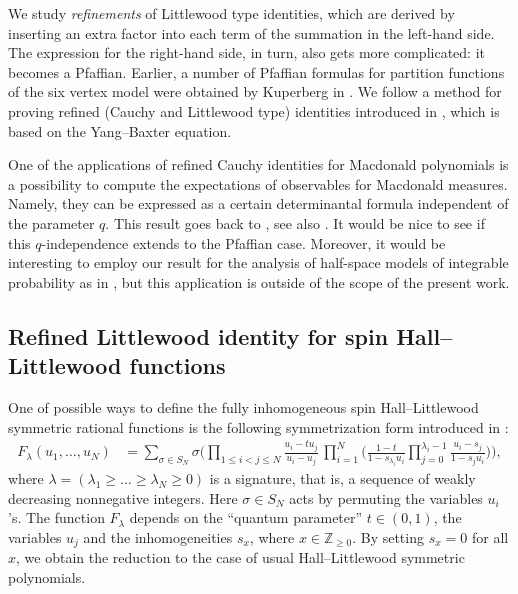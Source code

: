 \documentclass[11pt]{article}
\theoremstyle{definition}
\begin{document}
We study \emph{refinements} of Littlewood type identities,
which are derived by inserting an extra factor
into each term of the summation in the left-hand side.
The expression for the right-hand side, in turn, also gets more complicated: it becomes a Pfaffian. Earlier, a number of Pfaffian formulas for partition functions of the six vertex model were obtained by Kuperberg in \cite{Kup02}. We follow a method for proving refined (Cauchy and Littlewood type) identities introduced in \cite{WZJ16}, which is based on the Yang--Baxter equation.

One of the applications of refined Cauchy identities for Macdonald polynomials is a possibility to compute the expectations of observables for Macdonald
measures. Namely, they can be expressed as a certain determinantal formula independent of the parameter $q$.
This result goes back to 
\cite{KN99}, see also \cite{War08,Bor18,Pet21}.
It would be nice to see if this $q$-independence extends to the Pfaffian case. Moreover, it would be interesting to employ our result for the analysis of half-space models of integrable probability as in \cite{BBC20,BBCW18,BZ19}, but this application is outside of the scope of the present work.

\subsection{Refined Littlewood identity for spin Hall--Littlewood functions}

One of possible ways to define the fully inhomogeneous 
spin Hall--Littlewood 
symmetric rational functions is the following
symmetrization form introduced in \cite{BP18}:
\begin{equation*}
\begin{split}
F_\lambda(u_1,\ldots,u_N )
&=
\sum_{\sigma\in S_N}
\sigma
\Biggl( 
\prod_{1\le i<j\le N}\frac{u_i-t u_j}{u_i-u_j}\,
\prod_{i=1}^{N}
\biggl(
\frac{1-t}{1-s_{\lambda_i}u_i}
\prod_{j=0}^{\lambda_i-1}\frac{ u_i-s_j}{1- s_j u_i}
\biggr)
\Biggr),
\end{split}
\end{equation*}
where 
$\lambda=(\lambda_1\ge\ldots\ge \lambda_N\ge0 )$ is a signature, that is, a sequence of weakly decreasing nonnegative integers.
Here $\sigma\in S_N$
acts by permuting the variables $u_i$'s.
The function $F_\lambda$ depends on the ``quantum parameter''
$t \in (0, 1)$, the variables $u_j$ and the inhomogeneities $s_x$, where $x\in \mathbb{Z}_{\ge0}$.
By setting $s_x=0$ for all $x$, we obtain the reduction to the case of usual
Hall--Littlewood symmetric polynomials.
\end{document}
